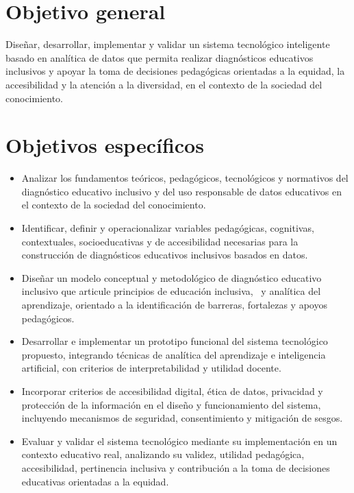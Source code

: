 \begin{refsection}
\section{Objetivo general}

Diseñar, desarrollar, implementar y validar un sistema tecnológico inteligente basado en analítica de datos que permita realizar diagnósticos educativos inclusivos y apoyar la toma de decisiones pedagógicas orientadas a la equidad, la accesibilidad y la atención a la diversidad, en el contexto de la sociedad del conocimiento.

\section{Objetivos específicos}

\begin{itemize}
\item Analizar los fundamentos teóricos, pedagógicos, tecnológicos y normativos del diagnóstico educativo inclusivo y del uso responsable de datos educativos en el contexto de la sociedad del conocimiento.

\item Identificar, definir y operacionalizar variables pedagógicas, cognitivas, contextuales, socioeducativas y de accesibilidad necesarias para la construcción de diagnósticos educativos inclusivos basados en datos.

\item Diseñar un modelo conceptual y metodológico de diagnóstico educativo inclusivo que articule principios de educación inclusiva, \DUA\ y analítica del aprendizaje, orientado a la identificación de barreras, fortalezas y apoyos pedagógicos.

\item Desarrollar e implementar un prototipo funcional del sistema tecnológico propuesto, integrando técnicas de analítica del aprendizaje e inteligencia artificial, con criterios de interpretabilidad y utilidad docente.

\item Incorporar criterios de accesibilidad digital, ética de datos, privacidad y protección de la información en el diseño y funcionamiento del sistema, incluyendo mecanismos de seguridad, consentimiento y mitigación de sesgos.

\item Evaluar y validar el sistema tecnológico mediante su implementación en un contexto educativo real, analizando su validez, utilidad pedagógica, accesibilidad, pertinencia inclusiva y contribución a la toma de decisiones educativas orientadas a la equidad.
\end{itemize}


\end{refsection}
